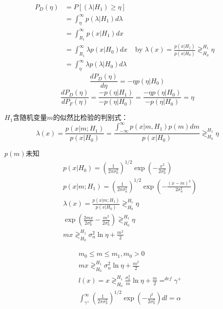 \begin{frame}
\begin{align*}
P_D(\eta) &=P[(\lambda|H_1)\ge\eta]&\\
&=\int_{\eta}^{\infty}p(\lambda|H_1)d\lambda&\\
&=\int_{R_1}^{\infty}p(x|H_1)dx&\\
&=\int_{R_1}^{\infty}\lambda p(x|H_0)dx &\text{ by }\lambda(x)=\frac{p(x|H_1)}{p(x|H_0)}\mathop{\gtrless}_{H_0}^{H_1}\eta&\\
&=\int_{\eta}^{\infty}\lambda p(\lambda|H_0)d\lambda&
\end{align*}
\[\frac{dP_D(\eta)}{d\eta}=-\eta p(\eta|H_0)\]
\[\frac{dP_D(\eta)}{dP_F(\eta)}=\frac{-p(\eta|H_1)}{-p(\eta|H_0)}=\frac{-\eta p(\eta|H_0)}{-p(\eta|H_0)}=\eta \]  
\end{frame}

\begin{frame}
$H_1$含随机变量$m$的似然比检验的判别式：
\[\lambda(x)=\frac{p(x|m; H_1)}{p(x|H_0)}=\frac{\int_{-\infty}^{\infty}p(x|m,H_1)p(m)dm}{p(x|H_0)}\mathop{\gtrless}_{H_0}^{H_1}\eta \]
\end{frame}

\begin{frame}
$p(m)$未知
\begin{align*}
&p(x|H_0)=(\frac{1}{2\pi\sigma_n^2})^{1/2}\exp(-\frac{x^2}{2\sigma_n^2})\\
&p(x|m;H_1)=(\frac{1}{2\pi\sigma_n^2})^{1/2}\exp(-\frac{(x-m)^2}{2\sigma_n^2})\\
&\lambda(x)=\frac{p(x|m; H_1)}{p(x|H_0)}\mathop{\gtrless}_{H_0}^{H_1}\eta\\
&\exp(\frac{2mx}{2\sigma_n^2}-\frac{m^2}{2\sigma_n^2})\mathop{\gtrless}_{H_0}^{H_1}\eta\\
&mx\mathop{\gtrless}_{H_0}^{H_1}\sigma_n^2\ln\eta+\frac{m^2}{2}
\end{align*}
\end{frame}

\begin{frame}
\begin{align*}
&m_0\le m\le m_1,m_0>0\\
&mx\mathop{\gtrless}_{H_0}^{H_1}\sigma_n^2\ln\eta+\frac{m^2}{2}\\
&l(x)=x\mathop{\gtrless}_{H_0}^{H_1}\frac{\sigma_n^2}{m}\ln\eta+\frac{m}{2}\mathop{=}^{def}\gamma^+\\
&\int_{\gamma^+}^{\infty}(\frac{1}{2\pi\sigma_n^2})^{1/2}\exp(-\frac{l^2}{2\sigma_n^2})dl=\alpha
\end{align*}
\end{frame}

